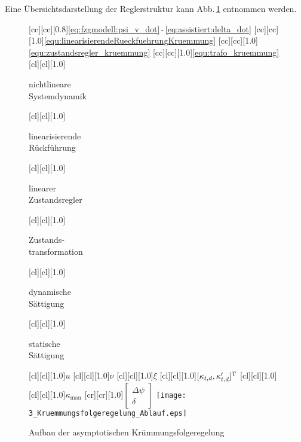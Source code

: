 Eine Übersichtsdarstellung der Reglerstruktur kann Abb.\,\ref{fig:KrAblauf} entnommen werden.

\begin{figure}[ht]
	\centering
   [cc][cc][0.8]{\eqref{eq:fzgmodell:psi_v_dot}\,-\,\eqref{eq:assistiert:delta_dot}}
	[cc][cc][1.0]{\eqref{equ:linearisierendeRueckfuehrungKruemmung}}
	[cc][cc][1.0]{\eqref{equ:zustandsregler_kruemmung}}
	[cc][cc][1.0]{\eqref{equ:trafo_kruemmung}}
	[cl][cl][1.0]{\parbox[st]{3cm}{nichtlineare\\Systemdynamik}}
	[cl][cl][1.0]{\parbox[t]{3cm}{linearisierende\\Rückführung}}
	[cl][cl][1.0]{\parbox[t]{3cm}{linearer\\Zustandsregler}}
	[cl][cl][1.0]{\parbox[t]{3cm}{Zustands-\\transformation}}
	[cl][cl][1.0]{\parbox[t]{3cm}{dynamische\\Sättigung}}
	[cl][cl][1.0]{\parbox[t]{3cm}{statische\\Sättigung}}
	[cl][cl][1.0]{$u$}
	[cl][cl][1.0]{$\nu$}
	[cl][cl][1.0]{$\xi$}
	[cl][cl][1.0]{$[\kappa_{t,d},\kappa_{t,d}']^{{\rm T}}$}
	[cl][cl][1.0]{}
	[cl][cl][1.0]{$\kappa_\text{man}$}
	[cr][cr][1.0]{$\begin{bmatrix}\Delta\psi\\\delta\end{bmatrix}$}
	\texttt{[image: 3\_Kruemmungsfolgeregelung\_Ablauf.eps]}
    \caption[Aufbau der asymptotischen Krümmungsfolgeregelung]{Aufbau der asymptotischen Krümmungsfolgeregelung }
    \label{fig:KrAblauf}
\end{figure}

